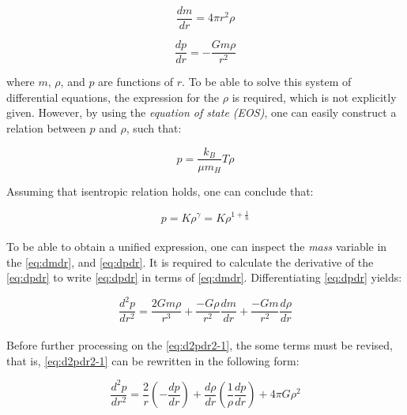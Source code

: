 \documentclass[letterpaper,12pt]{article}
\begin{document}
\begin{equation}
    \label{eq:dmdr}
    \frac{dm}{dr} = 4\pi r^2\rho
\end{equation}

\begin{equation}
    \label{eq:dpdr}
    \frac{dp}{dr} = -\frac{Gm\rho}{r^2}
\end{equation}

where $m$, $\rho$, and $p$ are functions of $r$. To be able to solve this system of differential equations, the expression for the $\rho$ is required, which is not explicitly given. However, by using the \textit{equation of state (EOS)}, one can easily construct a relation between $p$ and $\rho$, such that:

\begin{equation*}
    p = \frac{k_B}{\mu m_H}T\rho
\end{equation*}

Assuming that isentropic relation holds, one can conclude that:

\begin{equation}
    \label{eq:istro}
    p = K\rho^\gamma=K\rho^{1 + \frac{1}{n}} 
\end{equation}

\paragraph{} To be able to obtain a unified expression, one can inspect the \textit{mass} variable in the \eqref{eq:dmdr}, and \eqref{eq:dpdr}. It is required to calculate the derivative of the \eqref{eq:dpdr} to write \eqref{eq:dpdr} in terms of \eqref{eq:dmdr}. Differentiating \eqref{eq:dpdr} yields:

\begin{equation}
    \label{eq:d2pdr2-1}
    \frac{d^2p}{dr^2} = \frac{2Gm\rho}{r^3} + \frac{-G\rho}{r^2}\frac{dm}{dr} + \frac{-Gm}{r^2}\frac{d\rho}{dr}
\end{equation}

\paragraph{} Before further processing on the \eqref{eq:d2pdr2-1}, the some terms must be revised, that is, \eqref{eq:d2pdr2-1} can be rewritten in the following form:

\begin{equation}
    \label{eq:d2pdr2-2}
    \frac{d^2p}{dr^2} = \frac{2}{r}\left(-\frac{dp}{dr}\right) + \frac{d\rho}{dr}\left(\frac{1}{\rho}\frac{dp}{dr}\right) + 4\pi G \rho^2
\end{equation}
\end{document}
